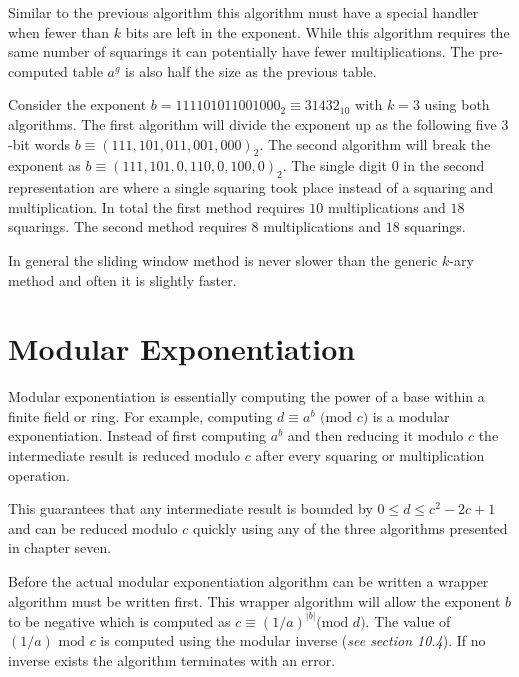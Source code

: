 \documentclass[b5paper]{book}
\begin{document}
Similar to the previous algorithm this algorithm must have a special handler when fewer than $k$ bits are left in the exponent.  While this
algorithm requires the same number of squarings it can potentially have fewer multiplications.  The pre-computed table $a^g$ is also half
the size as the previous table.  

Consider the exponent $b = 111101011001000_2 \equiv 31432_{10}$ with $k = 3$ using both algorithms.  The first algorithm will divide the exponent up as 
the following five $3$-bit words $b \equiv \left ( 111, 101, 011, 001, 000 \right )_{2}$.  The second algorithm will break the 
exponent as $b \equiv \left ( 111, 101, 0, 110, 0, 100, 0 \right )_{2}$.  The single digit $0$ in the second representation are where
a single squaring took place instead of a squaring and multiplication.  In total the first method requires $10$ multiplications and $18$ 
squarings.  The second method requires $8$ multiplications and $18$ squarings.  

In general the sliding window method is never slower than the generic $k$-ary method and often it is slightly faster.  

\section{Modular Exponentiation}

Modular exponentiation is essentially computing the power of a base within a finite field or ring.  For example, computing 
$d \equiv a^b \mbox{ (mod }c\mbox{)}$ is a modular exponentiation.  Instead of first computing $a^b$ and then reducing it 
modulo $c$ the intermediate result is reduced modulo $c$ after every squaring or multiplication operation.  

This guarantees that any intermediate result is bounded by $0 \le d \le c^2 - 2c + 1$ and can be reduced modulo $c$ quickly using
any of the three algorithms presented in chapter seven.  

Before the actual modular exponentiation algorithm can be written a wrapper algorithm must be written first.  This wrapper algorithm
will allow the exponent $b$ to be negative which is computed as $c \equiv \left (1 / a \right )^{\vert b \vert} \mbox{(mod }d\mbox{)}$. The
value of $(1/a) \mbox{ mod }c$ is computed using the modular inverse (\textit{see section 10.4}).  If no inverse exists the algorithm
terminates with an error.  
\end{document}
